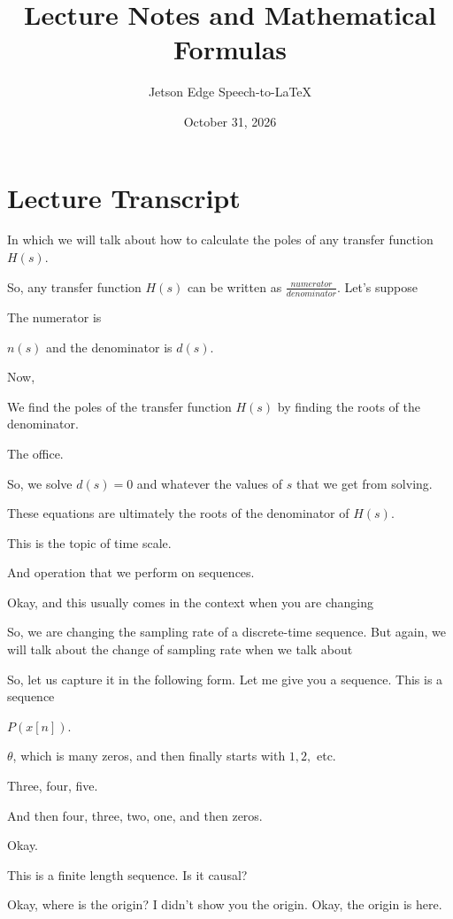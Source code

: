 \documentclass[11pt,a4paper]{article}
\title{Lecture Notes and Mathematical Formulas}
\author{Jetson Edge Speech-to-LaTeX}
\date{October 31, 2026}
\begin{document}
\maketitle

\section{Lecture Transcript}

In which we will talk about how to calculate the poles of any transfer function $H(s)$.

So, any transfer function $H(s)$ can be written as $\frac{numerator}{denominator}$. Let's suppose

The numerator is

$n(s)$ and the denominator is $d(s)$.

Now,

We find the poles of the transfer function $H(s)$ by finding the roots of the denominator.

The office.

So, we solve $d(s) = 0$ and whatever the values of $s$ that we get from solving.

These equations are ultimately the roots of the denominator of $H(s)$.

This is the topic of time scale.

And operation that we perform on sequences.

Okay, and this usually comes in the context when you are changing

So, we are changing the sampling rate of a discrete-time sequence. But again, we will talk about the change of sampling rate when we talk about

So, let us capture it in the following form. Let me give you a sequence. This is a sequence

$P(x[n])$.

$\theta$, which is many zeros, and then finally starts with $1, 2,$ etc.

Three, four, five.

And then four, three, two, one, and then zeros.

Okay.

This is a finite length sequence. Is it causal?

Okay, where is the origin? I didn't show you the origin. Okay, the origin is here.
\end{document}
